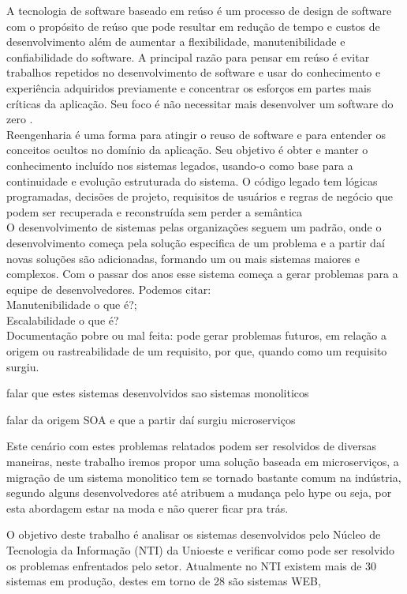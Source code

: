 \documentclass[12pt]{article}
\begin{document}
A tecnologia de software baseado em reúso é um processo de design de software com o propósito de reúso que pode resultar em redução de tempo e custos de desenvolvimento além de aumentar a flexibilidade, manutenibilidade e confiabilidade do software. A principal razão para pensar em reúso é evitar trabalhos repetidos no desenvolvimento de software e usar do conhecimento e experiência adquiridos previamente e concentrar os esforços em partes mais críticas da aplicação. Seu foco é não necessitar mais desenvolver um software do zero \cite{Yang}. 
\\
Reengenharia é uma forma para atingir o reuso de software e para entender os conceitos ocultos no domínio da aplicação. Seu objetivo é obter e manter o conhecimento incluído nos sistemas legados, usando-o como base para a continuidade e evolução estruturada do sistema. O código legado tem lógicas programadas, decisões de projeto, requisitos de usuários e regras de negócio que podem ser recuperada e reconstruída sem perder a semântica \cite{Garcia2004}
\\
O desenvolvimento de sistemas pelas organizações seguem um padrão, onde o desenvolvimento começa pela solução especifica de um problema e a partir daí novas soluções são adicionadas, formando um ou mais sistemas maiores e complexos. Com o passar dos anos esse sistema começa a gerar problemas para a equipe de desenvolvedores. Podemos citar: 
\\Manutenibilidade o que é?;
\\Escalabilidade o que é?
\\Documentação pobre ou mal feita: pode gerar problemas futuros, em relação a origem ou rastreabilidade de um requisito, por que, quando como um requisito surgiu.

falar que estes sistemas desenvolvidos sao sistemas monoliticos \cite{Dragoni2017}

falar da origem SOA e que a partir daí surgiu microserviços

Este cenário com estes problemas relatados podem ser resolvidos de diversas maneiras, neste trabalho iremos propor uma solução baseada em microserviços, a migração de um sistema monolitico tem se tornado bastante comum na indústria, segundo \cite{Carvalho2019} alguns desenvolvedores até atribuem a mudança pelo hype ou seja, por esta abordagem estar na moda e não querer ficar pra trás.


O objetivo deste trabalho é analisar os sistemas desenvolvidos pelo Núcleo de Tecnologia da Informação (NTI) da Unioeste e verificar como pode ser resolvido os problemas enfrentados pelo setor. Atualmente no NTI existem mais de 30 sistemas em produção, destes em torno de 28 são sistemas WEB, 
\end{document}
